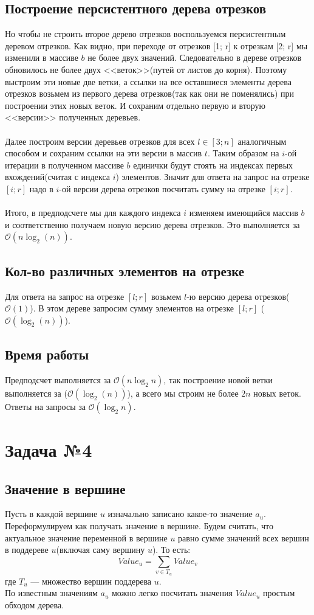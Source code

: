 \documentclass{article}
\begin{document}
\subsection*{Построение персистентного дерева отрезков}
Но чтобы не строить второе дерево отрезков воспользуемся персистентным деревом отрезков. Как видно, при переходе от отрезков [1; r] к отрезкам [2; r] мы изменили в массиве $b$ не более двух значений. Следовательно в дереве отрезков обновилось не более двух <<веток>>(путей от листов до корня). Поэтому выстроим эти новые две ветки, а ссылки на все оставшиеся элементы дерева отрезков возьмем из первого дерева отрезков(так как они не поменялись) при построении этих новых веток. И сохраним отдельно первую и вторую <<версии>> полученных деревьев.
\\\\
Далее построим версии деревьев отрезков для всех $l \in [3; n]$ аналогичным способом и сохраним ссылки на эти версии в массив $t$. Таким образом на $i$-ой итерации в полученном массиве $b$ единички будут стоять на индексах первых вхождений(считая с индекса $i$) элементов. Значит для ответа на запрос на отрезке $[i; r]$ надо в $i$-ой версии дерева отрезков посчитать сумму на отрезке $[i; r]$.
\\\\ Итого, в предподсчете мы для каждого индекса $i$ изменяем имеющийся массив $b$ и соответственно получаем новую версию дерева отрезков. Это выполняется за $\mathcal{O}(n\log_2(n))$.
\subsection*{Кол-во различных элементов на отрезке} 
	Для ответа на запрос на отрезке $[l; r]$ возьмем $l$-ю версию дерева отрезков($\mathcal{O}(1)$). В этом дереве запросим сумму элементов на отрезке $[l; r]$ ($\mathcal{O}(\log_2(n))$). 
\subsection*{Время работы}
Предподсчет выполняется за $\mathcal{O}(n\log_2{n})$, так построение новой ветки выполняется за ($\mathcal{O}(\log_2(n))$), а всего мы строим не более $2n$ новых веток. Ответы на запросы за $\mathcal{O}(\log_2{n})$.



\section*{Задача №4}
\subsection*{Значение в вершине}
Пусть в каждой вершине $u$ изначально записано какое-то значение $a_u$.
Переформулируем как получать значение в вершине.
Будем считать, что актуальное значение переменной в вершине $u$ равно сумме значений всех вершин в поддереве $u$(включая саму вершину $u$). То есть: 
$$ Value_u = \sum_{v \in T_u}Value_v$$ где $T_u$ --- множество вершин поддерева $u$. 
\\
По известным значениям $a_u$ можно легко посчитать значения $Value_u$ простым обходом дерева.
\end{document}
